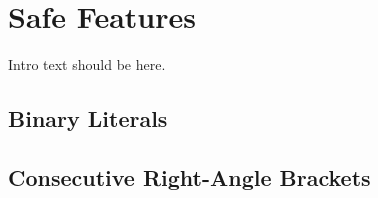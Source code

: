 
\chapter[Safe Features]{Safe Features}\label{ch-safe}

Intro text should be here.


\renewcommand{\cppxx}{C++11}

%


\newpage
\section[Binary Literals]{Binary Literals}\label{binary-literals}
\setcounter{table}{0}
\setcounter{footnote}{0}
\setcounter{lstlisting}{0}


\newpage
\section[Consecutive {\tt >}s]{Consecutive Right-Angle Brackets}\label{consecutive-right-angle-brackets}
\setcounter{table}{0}
\setcounter{footnote}{0}
\setcounter{lstlisting}{0}



